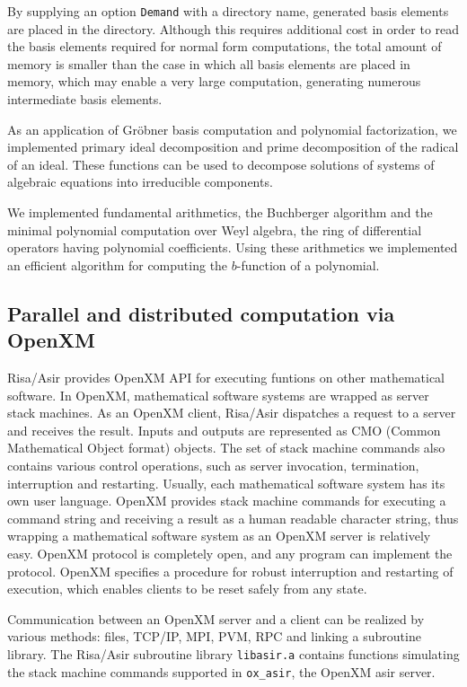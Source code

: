 \documentclass[12pt]{article}
\begin{document}
By supplying an option {\tt Demand} with a directory name, generated
basis elements are placed in the directory. Although this requires
additional cost in order to read the basis elements required for
normal form computations, the total amount of memory is smaller than
the case in which all basis elements are placed in memory, which may
enable a very large computation, generating numerous intermediate
basis elements.

As an application of Gr\"obner basis computation and polynomial
factorization, we implemented primary ideal decomposition and prime
decomposition of the radical of an ideal.  These functions can be used
to decompose solutions of systems of algebraic equations into
irreducible components. 

We implemented fundamental arithmetics, the Buchberger algorithm and
the minimal polynomial computation over Weyl algebra, the ring of
differential operators having polynomial coefficients.  Using these
arithmetics we implemented an efficient algorithm for computing the
$b$-function of a polynomial.

\subsection{Parallel and distributed computation via OpenXM}

Risa/Asir provides OpenXM API for executing funtions on other
mathematical software. In OpenXM, mathematical software systems are
wrapped as server stack machines. As an OpenXM client, Risa/Asir
dispatches a request to a server and receives the result. Inputs and
outputs are represented as CMO (Common Mathematical Object format)
objects.  The set of stack machine commands also contains various
control operations, such as server invocation, termination,
interruption and restarting.  Usually, each mathematical software
system has its own user language. OpenXM provides stack machine
commands for executing a command string and receiving a result as a
human readable character string, thus wrapping a mathematical software
system as an OpenXM server is relatively easy.  OpenXM protocol is
completely open, and any program can implement the protocol.  OpenXM
specifies a procedure for robust interruption and restarting of
execution, which enables clients to be reset safely from any state.

Communication between an OpenXM server and a client can be realized by various
methods: files, TCP/IP, MPI, PVM, RPC and linking a subroutine library.
The Risa/Asir subroutine library {\tt libasir.a} contains functions
simulating the stack machine commands supported in {\tt ox\_asir},
the OpenXM asir server.
\end{document}
